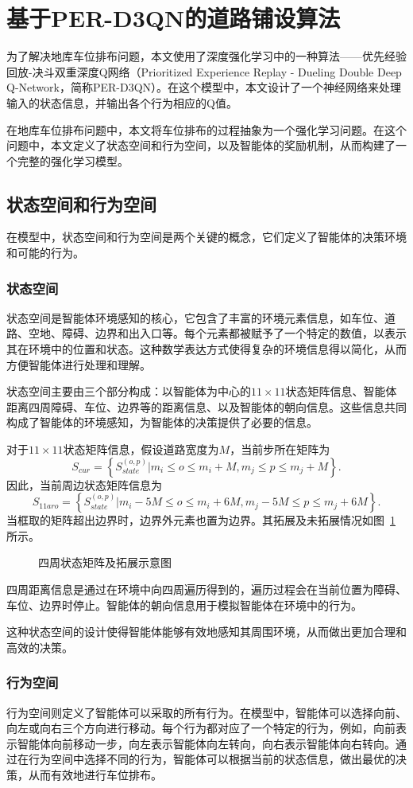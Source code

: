 \section{基于PER-D3QN的道路铺设算法}
为了解决地库车位排布问题，本文使用了深度强化学习中的一种算法——优先经验回放-决斗双重深度Q网络（Prioritized Experience Replay - Dueling Double Deep Q-Network，简称PER-D3QN）。在这个模型中，本文设计了一个神经网络来处理输入的状态信息，并输出各个行为相应的Q值。

在地库车位排布问题中，本文将车位排布的过程抽象为一个强化学习问题。在这个问题中，本文定义了状态空间和行为空间，以及智能体的奖励机制，从而构建了一个完整的强化学习模型。
\subsection{状态空间和行为空间}
在模型中，状态空间和行为空间是两个关键的概念，它们定义了智能体的决策环境和可能的行为。
\subsubsection{状态空间}
状态空间是智能体环境感知的核心，它包含了丰富的环境元素信息，如车位、道路、空地、障碍、边界和出入口等。每个元素都被赋予了一个特定的数值，以表示其在环境中的位置和状态。这种数学表达方式使得复杂的环境信息得以简化，从而方便智能体进行处理和理解。

状态空间主要由三个部分构成：以智能体为中心的$11\times 11$状态矩阵信息、智能体距离四周障碍、车位、边界等的距离信息、以及智能体的朝向信息。这些信息共同构成了智能体的环境感知，为智能体的决策提供了必要的信息。

对于$11\times 11$状态矩阵信息，假设道路宽度为$M$，当前步所在矩阵为$$S_{cur}=\left\{S_{state}^{(o,p)}|m_i\leq o\leq m_i+M, m_j\leq p\leq m_j+M\right\}.$$因此，当前周边状态矩阵信息为$$S_{11aro}=\left\{S_{state}^{(o,p)}|m_i-5M\leq o\leq m_i+6M, m_j-5M\leq p\leq m_j+6M\right\}.$$当框取的矩阵超出边界时，边界外元素也置为边界。其拓展及未拓展情况如图~\ref{fig:11_11} 所示。
\begin{figure}[!htb]
    \centering
    
    \caption{四周状态矩阵及拓展示意图}
    \label{fig:11_11}
\end{figure}

四周距离信息是通过在环境中向四周遍历得到的，遍历过程会在当前位置为障碍、车位、边界时停止。智能体的朝向信息用于模拟智能体在环境中的行为。

这种状态空间的设计使得智能体能够有效地感知其周围环境，从而做出更加合理和高效的决策。
\subsubsection{行为空间}
行为空间则定义了智能体可以采取的所有行为。在模型中，智能体可以选择向前、向左或向右三个方向进行移动。每个行为都对应了一个特定的行为，例如，向前表示智能体向前移动一步，向左表示智能体向左转向，向右表示智能体向右转向。通过在行为空间中选择不同的行为，智能体可以根据当前的状态信息，做出最优的决策，从而有效地进行车位排布。
